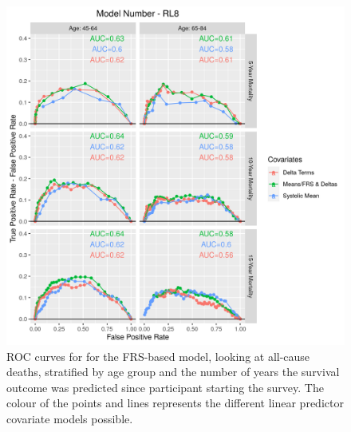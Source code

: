 \documentclass[
]{article}
\begin{document}
\begin{figure}
\hypertarget{fig:ROC_RL8}{%
\centering
\includegraphics{./Rmarkdown_Plots/ROC_CAx-Covariates_EventType_RL8.png}
\caption{ROC curves for for the FRS-based model, looking at all-cause deaths, stratified by age group and the number of years the survival outcome was predicted since participant starting the survey. The colour of the points and lines represents the different linear predictor covariate models possible.}\label{fig:ROC_RL8}
}
\end{figure}
\end{document}

